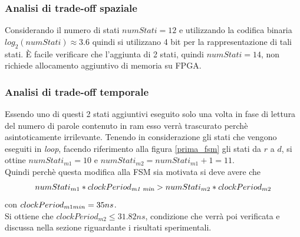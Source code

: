 \documentclass[11pt,a4paper]{article}
\begin{document}
            \subsubsection{Analisi di trade-off spaziale}
                Considerando il numero di stati $numStati = 12$ e utilizzando la codifica binaria $log_2(numStati) \approx 3.6$ quindi si utilizzano 4 bit per la rappresentazione di tali stati. È facile verificare che l'aggiunta di 2 stati, quindi $numStati = 14$, non richiede allocamento aggiuntivo di memoria su FPGA.
            \subsubsection{Analisi di trade-off temporale} \label{cap:tradeoff_temporale}
                Essendo uno di questi 2 stati aggiuntivi eseguito solo una volta in fase di lettura del numero di parole contenuto in ram esso verrà trascurato perchè asintoticamente irrilevante. Tenendo in considerazione gli stati che vengono eseguiti in \textit{loop}, facendo riferimento alla figura \ref{prima_fsm} gli stati da $r$ a $d$, si ottine $numStati_{m1} = 10$ e $numStati_{m2} =numStati_{m1} + 1= 11$.\\
                Quindi perchè questa modifica alla FSM sia motivata si deve avere che 
                \begin{gather*}
                    numStati_{m1} * clockPeriod_{\textit{\text{m1 min}}} > numStati_{m2} * clockPeriod_{m2} 
                \end{gather*}
                con $clockPeriod_{m1 \space min} = 35 ns$.\\
                Si ottiene che $clockPeriod_{m2} \leq 31.82 ns$, condizione che verrà poi verificata e discussa nella sezione riguardante i risultati sperimentali.
\end{document}
